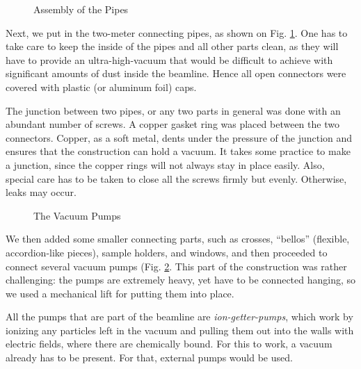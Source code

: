 \documentclass[a4paper,10pt]{article}
\begin{document}
\begin{figure}[htp]
  \begin{center}
  \end{center}
  \caption{Assembly of the Pipes}
  \label{image:constr02}
\end{figure}

    Next, we put in the two-meter connecting pipes, as shown on Fig.
\ref{image:constr02}. One has to take care to keep the inside of the pipes and
all other parts clean, as they will have to provide an ultra-high-vacuum that
would be difficult to achieve with significant amounts of dust inside the
beamline. Hence all open connectors were covered with plastic (or aluminum
foil) caps.

    The junction between two pipes, or any two parts in general was done with
an abundant number of screws. A copper gasket ring was placed between the two
connectors. Copper, as a soft metal, dents under the pressure of the junction
and ensures that the construction can hold a vacuum. It takes some practice to
make a junction, since the copper rings will not always stay in place easily.
Also, special care has to be taken to close all the screws firmly but evenly.
Otherwise, leaks may occur.

\begin{figure}[htbp]
  \begin{center}
  \end{center}
  \caption{The Vacuum Pumps}
  \label{image:constr03}
\end{figure}

We then added some smaller connecting parts, such as crosses, ``bellos''
(flexible, accordion-like pieces), sample holders, and windows, and
then proceeded to connect several vacuum pumps (Fig. \ref{image:constr03}. This
part of the construction was rather challenging: the pumps are extremely
heavy, yet have to be connected hanging, so we used a mechanical lift for
putting them into place.

    All the pumps that are part of the beamline are \emph{ion-getter-pumps},
which work by ionizing any particles left in the vacuum and pulling them out
into the walls with electric fields, where there are chemically bound. For this
to work, a vacuum already has to be present. For that, external pumps would be
used.
\end{document}

